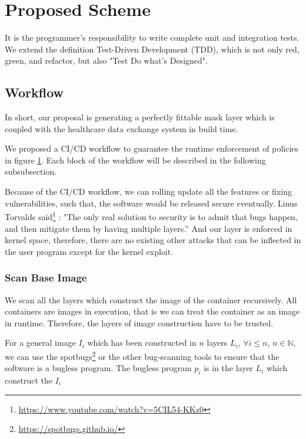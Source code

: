 \section{Proposed Scheme}
It is the programmer's responsibility to write complete unit and integration tests.
We extend the definition Test-Driven Development (TDD), which is not only red,
green, and refactor, but also "Test Do what's Designed".

\subsection{Workflow}
In short, our proposal is generating a perfectly fittable mask layer which
is coupled with the healthcare data exchange system in build time.

\begin{figure}[h]
    \centering
    \label{workflow}
\end{figure}

We proposed a CI/CD workflow to guarantee the runtime enforcement of policies
in figure \ref{workflow}. Each block of the workflow will be described
in the following subsubsection.

Because of the CI/CD workflow, we can rolling update all the features or
fixing vulnerabilities, such that, the software would be released secure
eventually. Linus Torvalds said\footnote{\url{https://www.youtube.com/watch?v=5CIL54-KKz0}}
: "The only real solution to security is to admit that bugs happen, and
then mitigate them by having multiple layers.” And our layer is enforced
in kernel space, therefore, there are no existing other attacks that can
be inflected in the user program except for the kernel exploit.


\subsubsection{Scan Base Image}
We scan all the layers which construct the image of the container recursively.
All containers are images in execution, that is we can treat the container
as an image in runtime. Therefore, the layers of image construction have to
be trusted.

For a general image $I_i$ which has been constructed in $n$ layers $L_i$,
$\forall i \le n$, $n \in \mathbb{N}$, we can use the spotbugs\footnote{\url{https://spotbugs.github.io/}}
or the other bug-scanning tools to ensure that the software is a bugless program.
The bugless program $p_i$ is in the layer $L_i$ which construct the $I_i$

